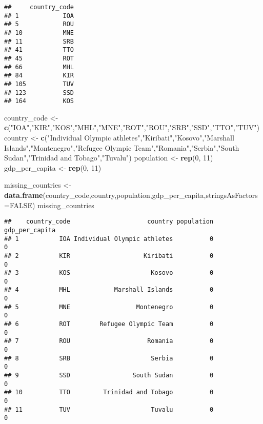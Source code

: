 \documentclass[]{article}
\newenvironment{Shaded}{\begin{snugshade}}{\end{snugshade}}
\newcommand{\DataTypeTok}[1]{\textcolor[rgb]{0.13,0.29,0.53}{#1}}
\newcommand{\DecValTok}[1]{\textcolor[rgb]{0.00,0.00,0.81}{#1}}
\newcommand{\KeywordTok}[1]{\textcolor[rgb]{0.13,0.29,0.53}{\textbf{#1}}}
\newcommand{\NormalTok}[1]{#1}
\newcommand{\OtherTok}[1]{\textcolor[rgb]{0.56,0.35,0.01}{#1}}
\newcommand{\StringTok}[1]{\textcolor[rgb]{0.31,0.60,0.02}{#1}}
\begin{document}
\begin{verbatim}
##     country_code
## 1            IOA
## 5            ROU
## 10           MNE
## 11           SRB
## 41           TTO
## 45           ROT
## 66           MHL
## 84           KIR
## 105          TUV
## 123          SSD
## 164          KOS
\end{verbatim}

\begin{Shaded}
\begin{Highlighting}[]
\NormalTok{    country_code <-}\StringTok{ }\KeywordTok{c}\NormalTok{(}\StringTok{"IOA"}\NormalTok{,}\StringTok{"KIR"}\NormalTok{,}\StringTok{"KOS"}\NormalTok{,}\StringTok{"MHL"}\NormalTok{,}\StringTok{"MNE"}\NormalTok{,}\StringTok{"ROT"}\NormalTok{,}\StringTok{"ROU"}\NormalTok{,}\StringTok{"SRB"}\NormalTok{,}\StringTok{"SSD"}\NormalTok{,}\StringTok{"TTO"}\NormalTok{,}\StringTok{"TUV"}\NormalTok{)}
\NormalTok{    country <-}\StringTok{ }\KeywordTok{c}\NormalTok{(}\StringTok{"Individual Olympic athletes"}\NormalTok{,}\StringTok{"Kiribati"}\NormalTok{,}\StringTok{"Kosovo"}\NormalTok{,}\StringTok{"Marshall Islands"}\NormalTok{,}\StringTok{"Montenegro"}\NormalTok{,}\StringTok{"Refugee Olympic Team"}\NormalTok{,}\StringTok{"Romania"}\NormalTok{,}\StringTok{"Serbia"}\NormalTok{,}\StringTok{"South Sudan"}\NormalTok{,}\StringTok{"Trinidad and Tobago"}\NormalTok{,}\StringTok{"Tuvalu"}\NormalTok{)}
\NormalTok{    population <-}\StringTok{ }\KeywordTok{rep}\NormalTok{(}\DecValTok{0}\NormalTok{, }\DecValTok{11}\NormalTok{)}
\NormalTok{    gdp_per_capita <-}\StringTok{ }\KeywordTok{rep}\NormalTok{(}\DecValTok{0}\NormalTok{, }\DecValTok{11}\NormalTok{)}

\NormalTok{    missing_countries <-}\StringTok{ }\KeywordTok{data.frame}\NormalTok{(country_code,country,population,gdp_per_capita,}\DataTypeTok{stringsAsFactors=}\OtherTok{FALSE}\NormalTok{)}
\NormalTok{    missing_countries}
\end{Highlighting}
\end{Shaded}

\begin{verbatim}
##    country_code                     country population gdp_per_capita
## 1           IOA Individual Olympic athletes          0              0
## 2           KIR                    Kiribati          0              0
## 3           KOS                      Kosovo          0              0
## 4           MHL            Marshall Islands          0              0
## 5           MNE                  Montenegro          0              0
## 6           ROT        Refugee Olympic Team          0              0
## 7           ROU                     Romania          0              0
## 8           SRB                      Serbia          0              0
## 9           SSD                 South Sudan          0              0
## 10          TTO         Trinidad and Tobago          0              0
## 11          TUV                      Tuvalu          0              0
\end{verbatim}
\end{document}

